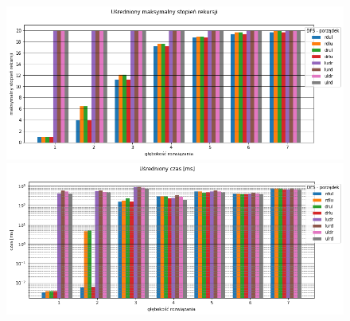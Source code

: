 \documentclass{classrep}
\begin{document}
\begin{figure}[H]
  \includegraphics[scale=0.735]{output_6_3.png}
  \includegraphics[scale=0.735]{output_6_4.png}
\end{figure}
\end{document}

